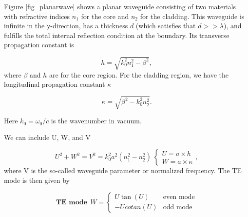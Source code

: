         Figure \ref{fig_planarwave} shows a planar waveguide consisting of two materials with refractive indices $n_1$ for the core and $n_2$ for the cladding. This waveguide is infinite in the y-direction, has a thickness $d$ (which satisfies that $d >> \lambda$), and fulfills the total internal reflection condition at the boundary.  Its transverse propagation constant is
        
        
                    \begin{equation}
                        h=\sqrt{k_0^2n_1^2-\beta^2},
                        \label{eq_h}
                    \end{equation}
         where $\beta$ and $h$ are for the core region. For the cladding region, we have the longitudinal propagation constant $\kappa$
        
                     \begin{equation}
                        \kappa=\sqrt{\beta^2-k_0^2n_2^2}.
                        \label{gam}
                    \end{equation}
         
         Here $k_0 = \omega_0/c$ is the wavenumber in vacuum.
        
        
        
        We can include U, W, and V
        
                    \begin{equation}
                        U^2+W^2 = V^2 = k_0^2a^2(n_1^2-n_2^2) \
                        \begin{cases}
                            U = a \times h \\
                            W = a \times \kappa
                        \end{cases} 
                        \label{Normv},
                    \end{equation}
        where V is the so-called waveguide parameter or normalized frequency. 
        The TE mode is then given by 
                 
                    
                    \begin{equation}
                    \textbf{TE mode} \ \ W=
                        \begin{cases}
                            U \tan(U) & \text{even mode}\\
                            -U cotan(U) & \text{odd mode}
                        \end{cases}
                        \label{Temode}
                    \end{equation}
        
